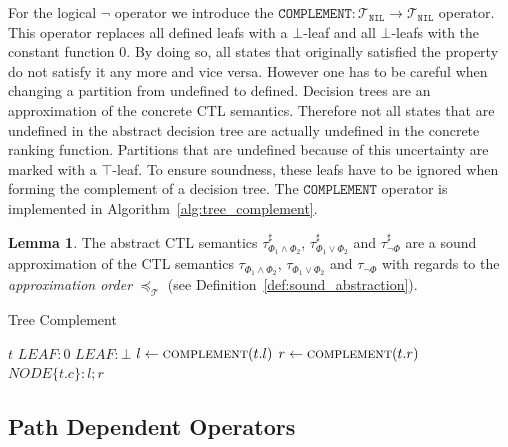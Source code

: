 \documentclass[11pt,a4paper,titlepage]{article}
\theoremstyle{definition}
\newtheorem{lemma}[theorem]{Lemma}
\begin{document}
For the logical $\neg$ operator we introduce the $\mathtt{COMPLEMENT}\colon \mathcal{T}_\mathtt{NIL} \rightarrow \mathcal{T}_\mathtt{NIL}$ operator. 
This operator replaces all defined leafs with a $\bot$-leaf and all $\bot$-leafs with the constant function $0$.
By doing so, all states that originally satisfied the property do not satisfy it any more and vice versa.
However one has to be careful when changing a partition from undefined to defined. Decision trees are an 
approximation of the concrete CTL semantics. Therefore not all states that are undefined in the abstract decision tree
are actually undefined in the concrete ranking function. Partitions that are undefined because of this uncertainty are marked with a 
$\top$-leaf. To ensure soundness, these leafs have to be ignored when forming the complement of a decision tree.   
The $\mathtt{COMPLEMENT}$ operator is implemented in Algorithm~\ref{alg:tree_complement}.


\begin{lemma}
    The abstract CTL semantics $\tau^{\sharp}_{\Phi_1 \land \Phi_2}$, $\tau^{\sharp}_{\Phi_1 \lor \Phi_2}$ and $\tau^{\sharp}_{\neg \Phi}$ 
    are a sound approximation of the CTL semantics
    $\tau_{\Phi_1 \land \Phi_2}$, $\tau_{\Phi_1 \lor \Phi_2}$ and $\tau_{\neg \Phi}$ with regards to the 
    \textit{approximation order} $\preceq_\mathcal{T}$ (see Definition~\ref{def:sound_abstraction}).
\end{lemma}


\begin{algorithm}[t]                    
    \caption{Tree Complement}         
    \label{alg:tree_complement}       
    \begin{algorithmic}
            \State \Return $t$
            \State \Return $LEAF: 0$
            \State \Return $LEAF: \bot$
        \Else
            \State $l \gets \Call{complement}{t.l}$
            \State $r \gets \Call{complement}{t.r}$
            \State \Return $NODE\{t.c \}: l ; r$
        \EndIf
        \EndFunction
\end{algorithmic}
\end{algorithm}


\subsection{Path Dependent Operators}
\end{document}
